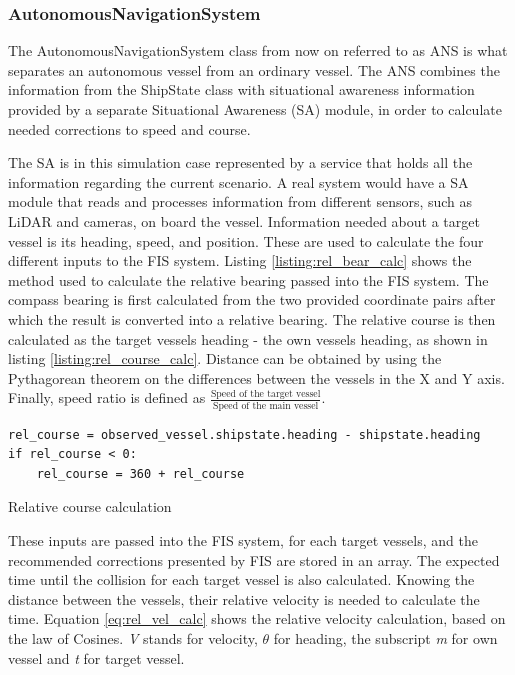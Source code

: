 \subsubsection{AutonomousNavigationSystem}
\label{sec:ANS}
The AutonomousNavigationSystem class from now on referred to as ANS is what separates an autonomous vessel from an ordinary vessel. The ANS combines the information from the ShipState class with situational awareness information provided by a separate Situational Awareness (SA) module, in order to calculate needed corrections to speed and course.

The SA is in this simulation case represented by a service that holds all the information regarding the current scenario. A real system would have a SA module that reads and processes information from different sensors, such as LiDAR and  cameras, on board the vessel. Information needed about a target vessel is its heading, speed, and position. These are used to calculate the four different inputs to the FIS system. Listing \ref{listing:rel_bear_calc} shows the method used to calculate the relative bearing passed into the FIS system. The compass bearing is first calculated from the two provided coordinate pairs after which the result is converted into a relative bearing. The relative course is then calculated as the target vessels heading - the own vessels heading, as shown in listing \ref{listing:rel_course_calc}. Distance can be obtained by using the Pythagorean theorem on the differences between the vessels in the X and Y axis. Finally, speed ratio is defined as $\frac{\text{Speed of the target vessel}}{\text{Speed of the main vessel}}$.
\begin{listing}

    \begin{verbatim}
rel_course = observed_vessel.shipstate.heading - shipstate.heading
if rel_course < 0:
    rel_course = 360 + rel_course
    \end{verbatim}
    \caption{Relative course calculation}
    \label{listing:rel_course_calc}
\end{listing}

These inputs are passed into the FIS system, for each target vessels, and the recommended corrections presented by FIS are stored in an array. The expected time until the collision for each target vessel is also calculated. Knowing the distance between the vessels, their relative velocity is needed to calculate the time. Equation \ref{eq:rel_vel_calc} shows the relative velocity calculation, based on the law of Cosines. \textit{V} stands for velocity, $\theta$ for heading, the subscript \textit{m} for own vessel and \textit{t} for target vessel.

